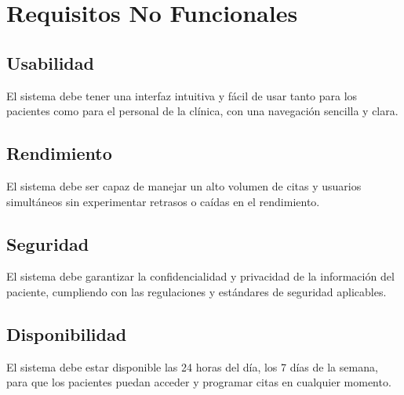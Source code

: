 \documentclass{article}
\theoremstyle{mytheoremstyle}
\theoremstyle{mytheoremstyle}
\theoremstyle{myproblemstyle}
\begin{document}
\newpage

\section{Requisitos No Funcionales}
\subsection{Usabilidad}
El sistema debe tener una interfaz intuitiva y fácil de usar tanto para los pacientes como para el personal de la clínica, con una navegación sencilla y clara.

\subsection{Rendimiento}
El sistema debe ser capaz de manejar un alto volumen de citas y usuarios simultáneos sin experimentar retrasos o caídas en el rendimiento.

\subsection{Seguridad}
El sistema debe garantizar la confidencialidad y privacidad de la información del paciente, cumpliendo con las regulaciones y estándares de seguridad aplicables.

\subsection{Disponibilidad}
El sistema debe estar disponible las 24 horas del día, los 7 días de la semana, para que los pacientes puedan acceder y programar citas en cualquier momento.
\end{document}
